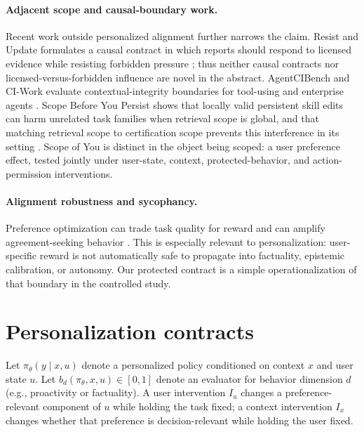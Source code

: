 \documentclass[10pt]{article}
\begin{document}
\paragraph{Adjacent scope and causal-boundary work.}
Recent work outside personalized alignment further narrows the claim. Resist and Update formulates a causal contract in which reports should respond to licensed evidence while resisting forbidden pressure \citep{resistupdate}; thus neither causal contracts nor licensed-versus-forbidden influence are novel in the abstract. AgentCIBench and CI-Work evaluate contextual-integrity boundaries for tool-using and enterprise agents \citep{agentcibench,ciwork}. Scope Before You Persist shows that locally valid persistent skill edits can harm unrelated task families when retrieval scope is global, and that matching retrieval scope to certification scope prevents this interference in its setting \citep{scopebefore}. Scope of You is distinct in the object being scoped: a user preference effect, tested jointly under user-state, context, protected-behavior, and action-permission interventions.

\paragraph{Alignment robustness and sycophancy.}
Preference optimization can trade task quality for reward and can amplify agreement-seeking behavior \citep{sycophancy,dpo}. This is especially relevant to personalization: user-specific reward is not automatically safe to propagate into factuality, epistemic calibration, or autonomy. Our protected contract is a simple operationalization of that boundary in the controlled study.

\section{Personalization contracts}
Let $\pi_\theta(y\mid x,u)$ denote a personalized policy conditioned on context $x$ and user state $u$. Let $b_d(\pi_\theta,x,u)\in[0,1]$ denote an evaluator for behavior dimension $d$ (e.g., proactivity or factuality). A user intervention $I_u$ changes a preference-relevant component of $u$ while holding the task fixed; a context intervention $I_x$ changes whether that preference is decision-relevant while holding the user fixed.
\end{document}
